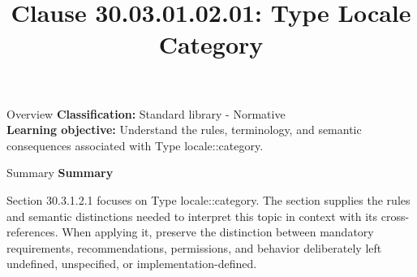 \documentclass[10pt,letterpaper]{article}
\title{Clause 30.03.01.02.01: Type Locale Category}
\author{}
\date{}
\begin{document}
\maketitle
\begin{CornellOverviewBox}{Overview}
\textbf{Classification:} Standard library - Normative\\[2pt]
\textbf{Learning objective:} Understand the rules, terminology, and semantic consequences associated with Type locale::category.
\end{CornellOverviewBox}\begin{CornellSummaryBox}{Summary}
{\sffamily\bfseries\color{Accent} Summary}\par\vspace{3pt}Section 30.3.1.2.1 focuses on Type locale::category. The section supplies the rules and semantic distinctions needed to interpret this topic in context with its cross-references. When applying it, preserve the distinction between mandatory requirements, recommendations, permissions, and behavior deliberately left undefined, unspecified, or implementation-defined.
\end{CornellSummaryBox}
\end{document}
